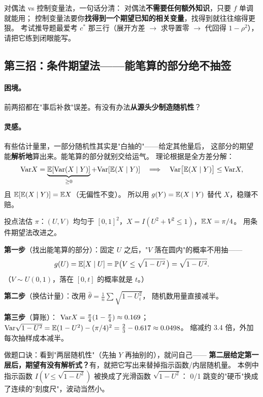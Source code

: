\begin{pbox}
对偶法 vs 控制变量法，一句话分清：
对偶法\textbf{不需要任何额外知识}，只要 $f$ 单调就能用；
控制变量法要你\textbf{找得到一个期望已知的相关变量}，找得到就往往缩得更狠。
考试推导题最爱考 $c^*$ 那三行（展开方差 $\to$ 求导置零 $\to$ 代回得 $1-\rho^2$），
请把它练到闭眼能写。
\end{pbox}

\subsection{第三招：条件期望法——能笔算的部分绝不抽签}

\paragraph{困境。}
前两招都在"事后补救"误差。有没有办法\textbf{从源头少制造随机性}？

\paragraph{灵感。}
有些估计量里，一部分随机性其实是"白抽的"——给定其他量后，
这部分的期望能\textbf{解析地}算出来。能笔算的部分就别交给运气。
理论根据是全方差分解：
\[
\mathrm{Var} X=\underbrace{\mathbb{E}[\mathrm{Var}(X\mid Y)]}_{\ge0}+\mathrm{Var}[\mathbb{E}(X\mid Y)]
\quad\Longrightarrow\quad
\mathrm{Var}\big[\mathbb{E}(X\mid Y)\big]\le\mathrm{Var} X ,
\]
且 $\mathbb{E}[\mathbb{E}(X\mid Y)]=\mathbb{E} X$（无偏性不变）。
所以用 $g(Y)=\mathbb{E}(X\mid Y)$ 替代 $X$，稳赚不赔。

\begin{exbox}
投点法估 $\pi$：$(U,V)$ 均匀于 $[0,1]^2$，$X=I(U^2+V^2\le1)$，$\mathbb{E} X=\pi/4$。
用条件期望法改进之。
\end{exbox}
\begin{sol}
\textbf{第一步}（找出能笔算的部分）：固定 $U$ 之后，"$V$ 落在圆内"的概率不用抽——
\[
g(U)=\mathbb{E}[X\mid U]=\mathbb{P}\big(V\le\sqrt{1-U^2}\,\big)=\sqrt{1-U^2}.
\]
（$V\sim U(0,1)$，落在 $[0,t]$ 的概率就是 $t$。）

\textbf{第二步}（换估计量）：改用 $\hat\theta=\frac1n\sum\sqrt{1-U_i^2}$，
随机数用量直接减半。

\textbf{第三步}（算账）：
$\mathrm{Var} X=\frac\pi4(1-\frac\pi4)\approx0.169$；
$\mathrm{Var}\sqrt{1-U^2}=\mathbb{E}(1-U^2)-(\pi/4)^2=\frac23-0.617\approx0.0498$。
缩减约 3.4 倍，外加每次抽样成本减半。
\end{sol}

\begin{pbox}
做题口诀：看到"两层随机性"（先抽 $Y$ 再抽别的），就问自己——
\textbf{第二层给定第一层后，期望有没有解析式？}有，就把它写出来替掉指示函数/内层随机量。
本例中指示函数 $I(V\le\sqrt{1-U^2})$ 被换成了光滑函数 $\sqrt{1-U^2}$：
0/1 跳变的"硬币"换成了连续的"刻度尺"，波动当然小。
\end{pbox}

